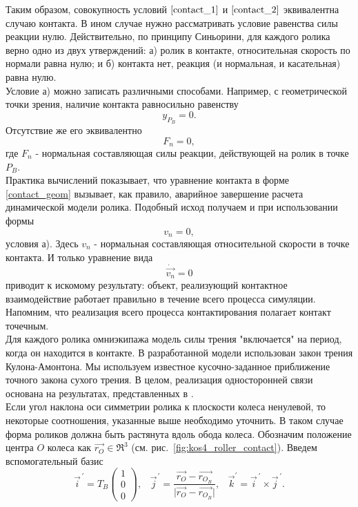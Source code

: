 \documentclass[12pt]{article}
\begin{document}
Таким образом, совокупность условий $\eqref{contact_1}$ и $\eqref{contact_2}$ эквивалентна случаю контакта. В ином случае нужно рассматривать условие равенства силы реакции нулю. Действительно, по принципу Синьорини, для каждого ролика верно одно из двух утверждений: а) ролик в контакте, относительная скорость по нормали равна нулю; и б) контакта нет, реакция (и нормальная, и касательная) равна нулю.\\

Условие а) можно записать различными способами. Например, с геометрической точки зрения, наличие контакта равносильно равенству
\begin{equation}
\label{contact_geom}
y_{P_B} = 0.
\end{equation}
Отсутствие же его эквивалентно
$$F_n = 0,$$
где $F_n$ - нормальная составляющая силы реакции, действующей на ролик в точке $P_B$.\\

Практика вычислений показывает, что уравнение контакта в форме \eqref{contact_geom} вызывает, как правило, аварийное завершение расчета динамической модели ролика. Подобный исход получаем и при использовании формы 
$$v_n = 0,$$
условия а). Здесь $v_n$ - нормальная составляющая относительной скорости в точке контакта. И только уравнение вида 
$$\dot{\vec{v_n}} = 0$$ приводит к искомому результату: объект, реализующий контактное взаимодействие работает правильно в течение всего процесса симуляции. Напомним, что реализация всего процесса контактирования полагает контакт точечным.\\

Для каждого ролика омниэкипажа модель силы трения "включается" на период, когда он находится в контакте. В разработанной модели использован закон трения Кулона-Амонтона. Мы используем известное кусочно-заданное приближение \cite{kos8} точного закона сухого трения. В целом, реализация односторонней связи основана на результатах, представленных в \cite{kos8}.\\

Если угол наклона оси симметрии ролика к плоскости колеса ненулевой, то некоторые соотношения, указанные выше необходимо уточнить. В таком случае форма роликов должна быть растянута вдоль обода колеса. Обозначим положение центра $O$ колеса как $\vec{r_O} \in \Re^3$ (см. рис.~\ref{fig:kos4_roller_contact}). Введем вспомогательный базис 
\begin{equation*}
\vec{i}^{\hspace{2pt}\prime} = T_B \left( \begin{array}{ccc} 1\\0\\0 \end{array}\right),\hspace{10pt}
\vec{j}^{\hspace{1pt}\prime} = \frac{\vec{r_O}-\vec{r_{O_B}}}{\vert\vec{r_O}-\vec{r_{O_B}}\vert},\hspace{10pt}
\vec{k}^\prime = \vec{i}^{\hspace{2pt}\prime}\times\vec{j}^{\hspace{2pt}\prime}.
\end{equation*}
\end{document}
